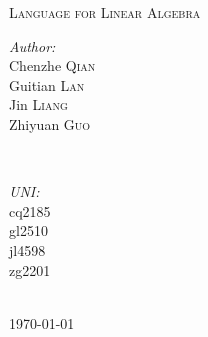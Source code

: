 \documentclass[12pt]{article} %
\begin{document}


\begin{titlepage}

\newcommand{\HRule}{\rule{\linewidth}{0.5mm}} %

\center %

\textsc{\LARGE Language for Linear Algebra}\\[1.0cm] %


\begin{minipage}{0.4\textwidth}
\begin{flushleft} \large
\emph{Author:}\\
Chenzhe \textsc{Qian} \\
Guitian \textsc{Lan} \\
Jin \textsc{Liang} \\
Zhiyuan \textsc{Guo}
\end{flushleft}
\end{minipage}
~
\begin{minipage}{0.4\textwidth}
\begin{flushright} \large
\emph{UNI:} \\
cq2185 \\
gl2510 \\
jl4598 \\
zg2201
\end{flushright}
\end{minipage}\\[4cm]

{\large \today}\\[3cm] %


\vfill %

\end{titlepage}
\end{document}
